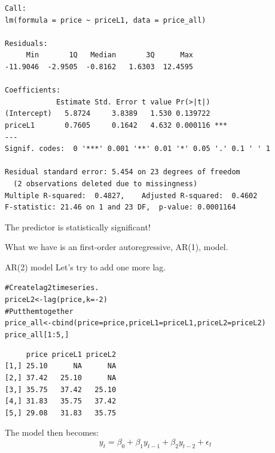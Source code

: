 \documentclass{beamer}\usepackage[]{graphicx}\usepackage[]{color}
\makeatletter
\newcommand{\hlnum}[1]{\textcolor[rgb]{0.824,0.412,0.118}{#1}}%
\newcommand{\hlcom}[1]{\textcolor[rgb]{0.824,0.706,0.549}{#1}}%
\newcommand{\hlopt}[1]{\textcolor[rgb]{1,0.894,0.769}{#1}}%
\newcommand{\hlstd}[1]{\textcolor[rgb]{1,0.894,0.769}{#1}}%
\newcommand{\hlkwb}[1]{\textcolor[rgb]{0.804,0.776,0.451}{#1}}%
\newcommand{\hlkwc}[1]{\textcolor[rgb]{0.78,0.941,0.545}{#1}}%
\newcommand{\hlkwd}[1]{\textcolor[rgb]{1,0.78,0.769}{#1}}%
\newenvironment{kframe}{%
 \def\at@end@of@kframe{}%
 \ifinner\ifhmode%
  \def\at@end@of@kframe{\end{minipage}}%
  \begin{minipage}{\columnwidth}%
 \fi\fi%
 \def\FrameCommand##1{\hskip\@totalleftmargin \hskip-\fboxsep
 \colorbox{shadecolor}{##1}\hskip-\fboxsep
     \hskip-\linewidth \hskip-\@totalleftmargin \hskip\columnwidth}%
 \MakeFramed {\advance\hsize-\width
   \@totalleftmargin\z@ \linewidth\hsize
   \@setminipage}}%
 {\par\unskip\endMakeFramed%
 \at@end@of@kframe}
\newenvironment{knitrout}{}{} %
\makeatother
\begin{document}
\begin{darkframes}
\begin{frame}[fragile]
\begin{knitrout}
\begin{kframe}
\begin{verbatim}
Call:
lm(formula = price ~ priceL1, data = price_all)

Residuals:
     Min       1Q   Median       3Q      Max 
-11.9046  -2.9505  -0.8162   1.6303  12.4595 

Coefficients:
            Estimate Std. Error t value Pr(>|t|)    
(Intercept)   5.8724     3.8389   1.530 0.139722    
priceL1       0.7605     0.1642   4.632 0.000116 ***
---
Signif. codes:  0 '***' 0.001 '**' 0.01 '*' 0.05 '.' 0.1 ' ' 1

Residual standard error: 5.454 on 23 degrees of freedom
  (2 observations deleted due to missingness)
Multiple R-squared:  0.4827,	Adjusted R-squared:  0.4602 
F-statistic: 21.46 on 1 and 23 DF,  p-value: 0.0001164
\end{verbatim}
\end{kframe}
\end{knitrout}
      \pause
      The predictor is statistically significant! 
      
      What we have is an first-order autoregressive, \alert{AR(1)}, model.
    \end{frame}
      
      
    \begin{frame}[fragile]{AR(2) model}
      \fontsize{8}{8}\selectfont
      Let's try to add one more lag.
\begin{knitrout}
\begin{kframe}
\begin{alltt}
\hlcom{# Create lag 2 time series.}
\hlstd{priceL2} \hlkwb{<-} \hlkwd{lag}\hlstd{(price,} \hlkwc{k}\hlstd{=}\hlopt{-}\hlnum{2}\hlstd{)}
\hlcom{# Put them together}
\hlstd{price_all} \hlkwb{<-} \hlkwd{cbind}\hlstd{(}\hlkwc{price}\hlstd{=price,} \hlkwc{priceL1}\hlstd{=priceL1,} \hlkwc{priceL2}\hlstd{=priceL2)}
\hlstd{price_all[}\hlnum{1}\hlopt{:}\hlnum{5}\hlstd{,]}
\end{alltt}
\begin{verbatim}
     price priceL1 priceL2
[1,] 25.10      NA      NA
[2,] 37.42   25.10      NA
[3,] 35.75   37.42   25.10
[4,] 31.83   35.75   37.42
[5,] 29.08   31.83   35.75
\end{verbatim}
\end{kframe}
\end{knitrout}
      \pause
      The model then becomes:
      $$
        y_t = \beta_0 + \beta_1 y_{t-1} + \beta_2 y_{t-2} + \epsilon_t
      $$
    \end{frame}
	
	
	

\end{darkframes}
\end{document}
